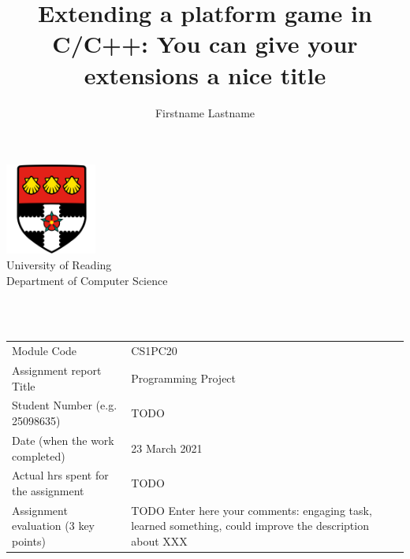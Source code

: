 \documentclass[a4paper,11pt]{article}
\title{Extending a platform game in C/C++: You can give your extensions a nice title}
\author{Firstname Lastname}
\begin{document}


    \begin{titlepage}
        \begin{center}
            \includegraphics[width=3cm]{figures/uorlogo.png}\\[0.5cm]
            {\LARGE University of Reading\\[0.5cm]
                Department of Computer Science}\\[2cm]

            \linespread{1.2}\huge {\thetitle}


            \linespread{1}~\\[2cm]

            {\Large \theauthor} \\[1cm]



            \normalsize
            \vfill
            \begin{tabular}{lp{10cm}}
            Module Code & CS1PC20 \\
            Assignment report Title &  Programming Project \\
            Student Number (e.g. 25098635)        & TODO \\
            Date (when the work completed)        & 23 March 2021 \\
            Actual hrs spent for the assignment   & TODO   \\
            Assignment evaluation (3 key points)  & TODO Enter here your comments: engaging task, learned something, could improve the description about XXX
            \end{tabular}
        \end{center}
    \end{titlepage}
\end{document}
